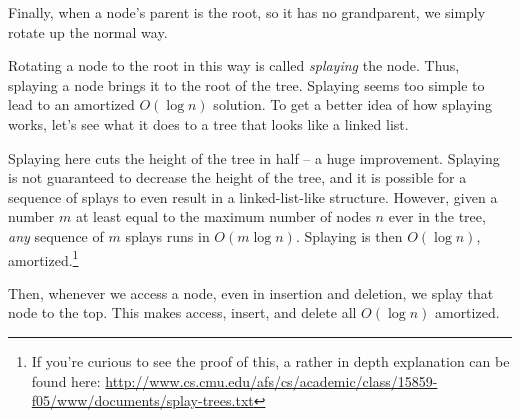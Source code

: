 \documentclass[11pt]{book}
\begin{document}
Finally, when a node's parent is the root, so it has no grandparent, we simply rotate up the normal way.

Rotating a node to the root in this way is called \textit{splaying} the node. Thus, splaying a node brings it to the root of the tree. Splaying seems too simple to lead to an amortized $O(\log{n})$ solution. To get a better idea of how splaying works, let's see what it does to a tree that looks like a linked list.

\begin{center}
\end{center}

Splaying here cuts the height of the tree in half -- a huge improvement. Splaying is not guaranteed to decrease the height of the tree, and it is possible for a sequence of splays to even result in a linked-list-like structure. However, given a number $m$ at least equal to the maximum number of nodes $n$ ever in the tree, \textit{any} sequence of $m$ splays runs in $O(m \log{n})$. Splaying is then $O(\log{n})$, amortized.\footnote{If you're curious to see the proof of this, a rather in depth explanation can be found here: \url{http://www.cs.cmu.edu/afs/cs/academic/class/15859-f05/www/documents/splay-trees.txt}}

Then, whenever we access a node, even in insertion and deletion, we splay that node to the top. This makes access, insert, and delete all $O(\log{n})$ amortized.
\end{document}
